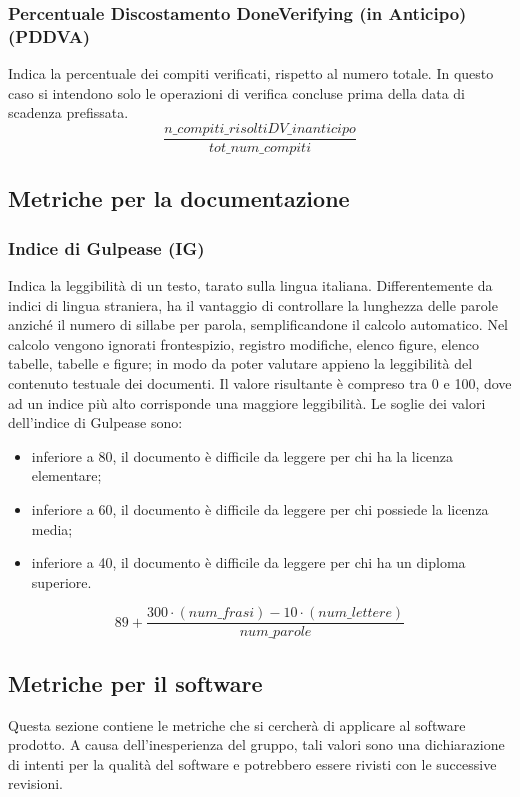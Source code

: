 \subsubsection{Percentuale Discostamento DoneVerifying (in Anticipo) (PDDVA)}
Indica la percentuale dei compiti verificati, rispetto al numero totale. In questo caso si intendono solo le operazioni di verifica concluse prima della data di scadenza prefissata.
\[\frac{n\_compiti\_risoltiDV\_inanticipo}{tot\_num\_compiti}\]
\subsection{Metriche per la documentazione}

\subsubsection{Indice di Gulpease (IG)}
Indica la leggibilità di un testo, tarato sulla lingua italiana. Differentemente da indici di lingua straniera, ha il vantaggio di controllare la lunghezza delle parole anziché il numero di sillabe per parola, semplificandone il calcolo automatico.
Nel calcolo vengono ignorati frontespizio, registro modifiche, elenco figure, elenco tabelle, tabelle e figure; in modo da poter valutare appieno la leggibilità del contenuto testuale dei documenti.
Il valore risultante è compreso tra 0 e 100, dove ad un indice più alto corrisponde una maggiore leggibilità.
Le soglie dei valori dell'indice di Gulpease sono:
\begin{itemize}
    \item inferiore a 80, il documento è difficile da leggere per chi ha la licenza elementare;
    \item inferiore a 60, il documento è difficile da leggere per chi possiede la licenza media;
    \item inferiore a 40, il documento è difficile da leggere per chi ha un diploma superiore.
\end{itemize}
\[
    89+ \frac{300\cdot (num\_frasi) - 10\cdot (num\_lettere)}{num\_parole}
\]

\subsection{Metriche per il software}
Questa sezione contiene le metriche che si cercherà di applicare al software prodotto. A causa dell'inesperienza del gruppo, tali valori sono una dichiarazione di intenti per la qualità del software e potrebbero essere rivisti con le successive revisioni.

